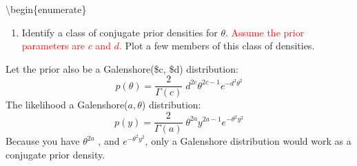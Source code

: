 \documentclass[
]{article}
\providecommand{\tightlist}{%
  \setlength{\itemsep}{0pt}\setlength{\parskip}{0pt}}
\begin{document}
\textbackslash begin\{enumerate\}

\item

\begin{enumerate}
\def\labelenumi{(\arabic{enumi})}
\setcounter{enumi}{9}
\tightlist
\item
  Identify a class of conjugate prior densities for \(\theta\).
  \textcolor{red}{Assume the prior parameters are $c$ and $d.$} Plot a
  few members of this class of densities.
\end{enumerate}

Let the prior also be a Galenshore(\$c, \$d) distribution:
\[p(\theta) = \frac{2}{\Gamma(c)} \; d^{2c} \theta^{2c - 1} e^{-d^2 \theta^2}\]
The likelihood a Galenshore(\(a, \theta\)) distribution:
\[p(y) = \frac{2}{\Gamma(a)} \; \theta^{2a} y^{2a - 1} e^{-\theta^2 y^2}\]
Because you have \(\theta^{2a}\) , and \(e^{-\theta^2 y^2}\), only a
Galenshore distribution would work as a conjugate prior density.
\end{document}
